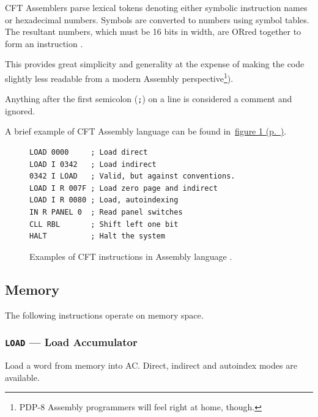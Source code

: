 \documentclass[11pt,a4paper,twocolumns]{article}
\newcommand{\cf}[2][section]{\hyperref[#2]{#1 \ref*{#2} (p.~\pageref*{#2})}}
\newcommand{\fcf}[1]{\cf[figure]{#1}}
\newcommand\hex[1]{\textsf{#1}}
\newcommand\register[1]{\textsf{#1}}
\newcommand\A{\register{AC}}
\begin{document}
CFT Assemblers parse lexical tokens denoting either symbolic
instruction names or hexadecimal numbers. Symbols are converted to
numbers using symbol tables. The resultant numbers, which must be 16
bits in width, are ORred together to form an instruction%
.

This provides great simplicity and generality at the expense of making
the code slightly less readable from a modern Assembly
perspective\footnote{PDP-8 Assembly programmers will feel right at
  home, though.}).

Anything after the first semicolon ({\tt ;}) on a line is considered a
comment and ignored.

A brief example of CFT Assembly language can be found in~\fcf{fig-asm}.

\begin{figure}
\small
\begin{verbatim}
LOAD 0000     ; Load direct
LOAD I 0342   ; Load indirect
0342 I LOAD   ; Valid, but against conventions.
LOAD I R 007F ; Load zero page and indirect
LOAD I R 0080 ; Load, autoindexing
IN R PANEL 0  ; Read panel switches
CLL RBL       ; Shift left one bit
HALT          ; Halt the system
\end{verbatim}
\caption{\label{fig-asm}Examples of CFT instructions in Assembly language .}
\end{figure}

\subsection{Memory}

The following instructions operate on memory space.

\subsubsection{{\tt LOAD} — Load Accumulator}
\label{sec-load}

Load a word from memory into \A. Direct, indirect and autoindex modes are available.
\end{document}
